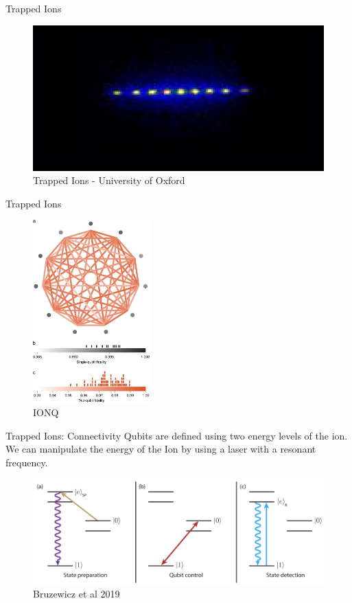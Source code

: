 \documentclass{beamer}
\begin{document}
\begin{frame}{Trapped Ions}
    \begin{figure}
        \centering
        \includegraphics[width=\textwidth]{images/cropion.png}
        \caption{Trapped Ions - University of Oxford}
    \end{figure}
\end{frame}

\begin{frame}{Trapped Ions}
    \begin{figure}
        \centering
        \includegraphics[width=0.4\textwidth]{images/ionq_connectiviy.png}
        \caption{IONQ}
    \end{figure}
\end{frame}

\begin{frame}{Trapped Ions: Connectivity}
    Qubits are defined using two energy levels of the ion.\\
    We can manipulate the energy of the Ion by using a laser with a resonant frequency.\vfill
    \begin{figure}
        \centering
        \includegraphics[width=\textwidth]{images/iondiagram.png}
        \caption{Bruzewicz et al 2019}
    \end{figure}
\end{frame}
\end{document}
